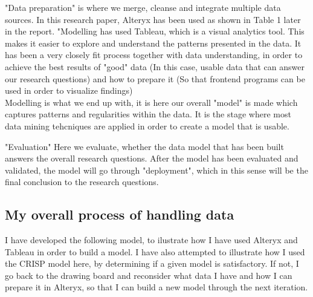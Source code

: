 \documentclass[11pt]{article}
\begin{document}
"Data preparation" is where we merge, cleanse and integrate multiple data sources. In this research paper, Alteryx has been used as shown in Table 1 later in the report.
"Modelling has used Tableau, which is a visual analytics tool. This makes it easier to explore and understand the patterns presented in the data. It has been a very closely fit process together with data understanding, in order to achieve the best results of "good" data (In this case, usable data that can answer our research questions)  and how to prepare it (So that frontend programs can be used in order to visualize  findings) \\

Modelling is what we end up with, it is here our overall "model" is made which captures patterns and regularities within the data. It is the stage where most data mining tehcniques are applied in order to create a model that is usable.

"Evaluation" Here we evaluate, whether the data model that has been built answers the overall research questions. After the model has been evaluated and validated, the model will go through "deployment", which in this sense will be the final conclusion to
the research questions.\\


\subsection {My overall process of handling data}

I have developed the following model, to ilustrate how I have used Alteryx and Tableau in order to build a model. I have also attempted to illustrate how I used the CRISP model here, by determining if a given model is satisfactory. If not, I go back to the drawing board and reconsider what data I have and how I can prepare it in Alteryx, so that I can build a new model through the next iteration.
\end{document}
